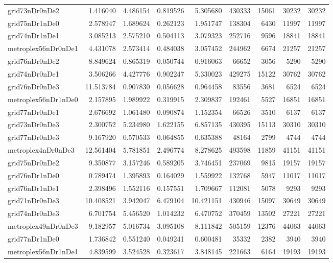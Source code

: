 \begin{longtable}{|l|r|r|r|r|r|r|r|r|}
grid73nDr0nDe2 & 1.416040 & 4.486154 & 0.819526 & 5.305680 & 430333 & 15061 & 30232 & 30232 \\
grid75nDr1nDe0 & 2.578947 & 1.689624 & 0.262123 & 1.951747 & 138304 & 6430 & 11997 & 11997 \\
grid74nDr1nDe1 & 3.085213 & 2.575210 & 0.504113 & 3.079323 & 252716 & 9596 & 18841 & 18841 \\
metroplex56nDr0nDe1 & 4.431078 & 2.573414 & 0.484038 & 3.057452 & 244962 & 6674 & 21257 & 21257 \\
grid76nDr0nDe2 & 8.849624 & 0.865319 & 0.050744 & 0.916063 & 66652 & 3056 & 5290 & 5290 \\
grid74nDr0nDe1 & 3.506266 & 4.427776 & 0.902247 & 5.330023 & 429275 & 15122 & 30762 & 30762 \\
grid76nDr0nDe3 & 11.513784 & 0.907830 & 0.056628 & 0.964458 & 83556 & 3681 & 6524 & 6524 \\
metroplex56nDr1nDe0 & 2.157895 & 1.989922 & 0.319915 & 2.309837 & 192461 & 5527 & 16851 & 16851 \\
grid77nDr0nDe1 & 2.676692 & 1.061480 & 0.090874 & 1.152354 & 66526 & 3510 & 6137 & 6137 \\
grid73nDr0nDe3 & 2.300752 & 5.234980 & 1.622155 & 6.857135 & 430395 & 15113 & 30310 & 30310 \\
grid77nDr0nDe3 & 9.167920 & 0.570533 & 0.064855 & 0.635388 & 48164 & 2799 & 4744 & 4744 \\
metroplex4nDr0nDe3 & 12.561404 & 5.781851 & 2.496774 & 8.278625 & 493598 & 11859 & 41151 & 41151 \\
grid75nDr0nDe2 & 9.350877 & 3.157246 & 0.589205 & 3.746451 & 237069 & 9815 & 19157 & 19157 \\
grid76nDr1nDe0 & 0.789474 & 1.395893 & 0.164029 & 1.559922 & 132768 & 5947 & 11017 & 11017 \\
grid76nDr1nDe1 & 2.398496 & 1.552116 & 0.157551 & 1.709667 & 112081 & 5078 & 9293 & 9293 \\
grid71nDr0nDe3 & 10.408521 & 3.942047 & 6.479104 & 10.421151 & 430946 & 15097 & 30649 & 30649 \\
grid74nDr0nDe3 & 6.701754 & 5.456520 & 1.014232 & 6.470752 & 370459 & 13502 & 27221 & 27221 \\
metroplex49nDr0nDe3 & 9.182957 & 5.016734 & 3.095108 & 8.111842 & 505159 & 12376 & 44063 & 44063 \\
grid77nDr1nDe0 & 1.736842 & 0.551240 & 0.049241 & 0.600481 & 35332 & 2382 & 3940 & 3940 \\
metroplex56nDr1nDe1 & 4.839599 & 3.524528 & 0.323617 & 3.848145 & 221663 & 6164 & 19193 & 19193 \\

\end{longtable}

